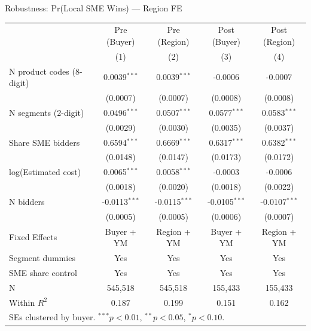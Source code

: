 \documentclass[9pt,aspectratio=169]{beamer}
\begin{document}
\begin{frame}[noframenumbering]{Robustness: Pr(Local SME Wins) --- Region FE}
\centering\small
\begin{tabular}{lcccc}
\toprule
 & Pre (Buyer) & Pre (Region) & Post (Buyer) & Post (Region) \\
 & (1) & (2) & (3) & (4) \\
\midrule
N product codes (8-digit) & 0.0039$^{***}$ & 0.0039$^{***}$ & -0.0006 & -0.0007 \\
 & (0.0007) & (0.0007) & (0.0008) & (0.0008) \\[2pt]
N segments (2-digit) & 0.0496$^{***}$ & 0.0507$^{***}$ & 0.0577$^{***}$ & 0.0583$^{***}$ \\
 & (0.0029) & (0.0030) & (0.0035) & (0.0037) \\[2pt]
Share SME bidders & 0.6594$^{***}$ & 0.6669$^{***}$ & 0.6317$^{***}$ & 0.6382$^{***}$ \\
 & (0.0148) & (0.0147) & (0.0173) & (0.0172) \\[2pt]
log(Estimated cost) & 0.0065$^{***}$ & 0.0058$^{***}$ & -0.0003 & -0.0006 \\
 & (0.0018) & (0.0020) & (0.0018) & (0.0022) \\[2pt]
N bidders & -0.0113$^{***}$ & -0.0115$^{***}$ & -0.0105$^{***}$ & -0.0107$^{***}$ \\
 & (0.0005) & (0.0005) & (0.0006) & (0.0007) \\[2pt]
\midrule
Fixed Effects & Buyer + YM & Region + YM & Buyer + YM & Region + YM \\
Segment dummies & Yes & Yes & Yes & Yes \\
SME share control & Yes & Yes & Yes & Yes \\
N & 545,518 & 545,518 & 155,433 & 155,433 \\
Within $R^2$ & 0.187 & 0.199 & 0.151 & 0.162 \\
\bottomrule
\multicolumn{5}{l}{\footnotesize SEs clustered by buyer. $^{***}p<0.01$, $^{**}p<0.05$, $^{*}p<0.10$.} \\
\end{tabular}
\end{frame}
\end{document}
